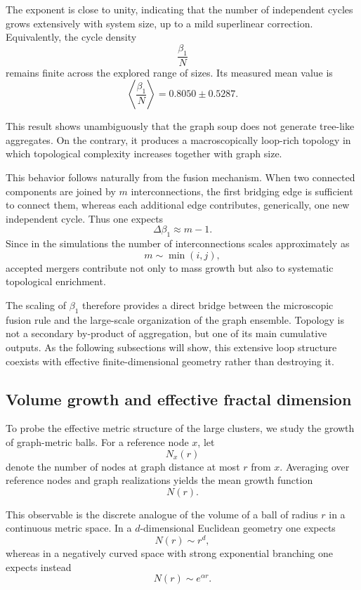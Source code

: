 \documentclass[11pt]{article}
\begin{document}
The exponent is close to unity, indicating that the number of independent cycles grows extensively with system size, up to a mild superlinear correction.
Equivalently, the cycle density
\[
\frac{\beta_1}{N}
\]
remains finite across the explored range of sizes.
Its measured mean value is
\[
\left\langle \frac{\beta_1}{N} \right\rangle
=
0.8050 \pm 0.5287.
\]

This result shows unambiguously that the graph soup does not generate tree-like aggregates.
On the contrary, it produces a macroscopically loop-rich topology in which topological complexity increases together with graph size.

This behavior follows naturally from the fusion mechanism.
When two connected components are joined by $m$ interconnections, the first bridging edge is sufficient to connect them, whereas each additional edge contributes, generically, one new independent cycle.
Thus one expects
\[
\Delta \beta_1 \approx m-1.
\]
Since in the simulations the number of interconnections scales approximately as
\[
m \sim \min(i,j),
\]
accepted mergers contribute not only to mass growth but also to systematic topological enrichment.

The scaling of $\beta_1$ therefore provides a direct bridge between the microscopic fusion rule and the large-scale organization of the graph ensemble.
Topology is not a secondary by-product of aggregation, but one of its main cumulative outputs.
As the following subsections will show, this extensive loop structure coexists with effective finite-dimensional geometry rather than destroying it.
\subsection{Volume growth and effective fractal dimension}
\label{sec:fractal_dimension}

To probe the effective metric structure of the large clusters, we study the growth of graph-metric balls.
For a reference node $x$, let
\[
N_x(r)
\]
denote the number of nodes at graph distance at most $r$ from $x$.
Averaging over reference nodes and graph realizations yields the mean growth function
\[
N(r).
\]

This observable is the discrete analogue of the volume of a ball of radius $r$ in a continuous metric space.
In a $d$-dimensional Euclidean geometry one expects
\[
N(r)\sim r^d,
\]
whereas in a negatively curved space with strong exponential branching one expects instead
\[
N(r)\sim e^{\alpha r}.
\]
\end{document}
